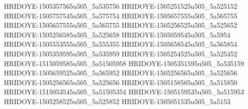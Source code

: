 HRIDOYE-1505357565u505_5a535756
HRIDOYE-1505251525u505_5a525152
HRIDOYE-1505757545u505_5a575754
HRIDOYE-1505657555u505_5a565755
HRIDOYE-1505657555u505_5a565755
HRIDOYE-1505256525u505_5a525652
HRIDOYE-1505256585u505_5a525658
HRIDOYE-1505059545u505_5a5954
HRIDOYE-1505553555u505_5a555355
HRIDOYE-1505658545u505_5a565854
HRIDOYE-1505359595u505_5a535959
HRIDOYE-1505254525u505_5a525452
HRIDOYE-1515059585u505_5a51505958
HRIDOYE-1505351595u505_5a535159
HRIDOYE-1505659525u505_5a565952
HRIDOYE-1505256565u505_5a525656
HRIDOYE-1505256565u505_5a525656
HRIDOYE-1505158505u505_5a515850
HRIDOYE-1515053545u505_5a51505354
HRIDOYE-1505159535u505_5a515953
HRIDOYE-1505258525u505_5a525852
HRIDOYE-1505051535u505_5a5153
